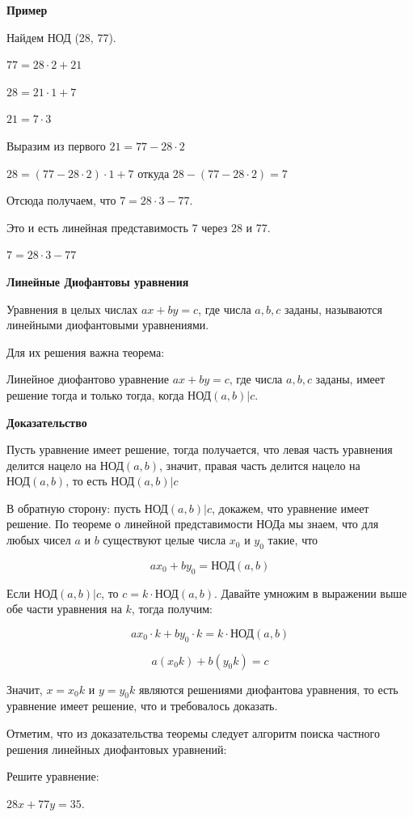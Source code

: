 {\bf Пример}

Найдем НОД (28, 77).

$77=28\cdot2 +21$

$28=21 \cdot 1 +7$

$21=7 \cdot 3$

Выразим из первого $21=77-28\cdot2$

$28=(77-28\cdot2)\cdot 1+7$ откуда $28-(77-28\cdot 2)=7$

Отсюда получаем, что $7=28\cdot 3 - 77$.

Это и есть линейная представимость 7 через 28 и 77. 

$7=28\cdot 3 - 77$

\centerline{\bf \Huge Линейные Диофантовы уравнения} 

Уравнения в целых числах $ax+by = c$, где числа $a,b,c$ заданы, называются линейными диофантовыми уравнениями. 

Для их решения важна теорема:

Линейное диофантово уравнение $ax+by = c$, где числа $a,b,c$ заданы, имеет решение тогда и только тогда, когда $\text{НОД}(a,b) |c$.

{\bf Доказательство}

Пусть уравнение имеет решение, тогда получается, что левая часть уравнения делится нацело на $\text{НОД}(a,b)$, значит, правая часть делится нацело на $\text{НОД}(a,b)$, то есть $\text{НОД}(a,b) | c$

В обратную сторону: пусть $\text{НОД}(a,b) | c$, докажем, что уравнение имеет решение. По теореме о линейной представимости НОДа мы знаем, что для любых чисел $a$ и $b$ существуют целые числа $x_0$ и $y_0$ такие, что 

$$ax_0+by_0 = \text{НОД}(a,b)$$


Если $\text{НОД}(a,b)|c$, то $c = k \cdot \text{НОД}(a,b)$. Давайте умножим в выражении выше обе части уравнения на $k$, тогда получим:

$$ax_0 \cdot k + by_0\cdot k = k \cdot \text{НОД}(a,b)$$

$$a(x_0k)+b(y_0k)=c$$

Значит, $x=x_0k$ и $y=y_0k$ являются решениями диофантова уравнения, то есть уравнение имеет решение, что и требовалось доказать.


Отметим, что из доказательства теоремы следует алгоритм поиска частного решения линейных диофантовых уравнений:

Решите уравнение:

$28x+77y=35$.

